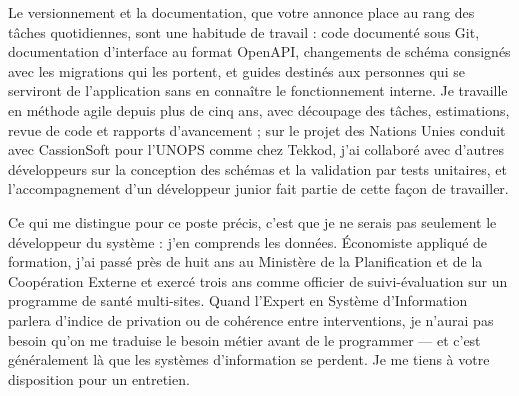 \documentclass[10pt,a4paper,sans]{moderncv}
\begin{document}
Le versionnement et la documentation, que votre annonce place au rang des tâches quotidiennes, sont une habitude de travail : code documenté sous Git, documentation d'interface au format OpenAPI, changements de schéma consignés avec les migrations qui les portent, et guides destinés aux personnes qui se serviront de l'application sans en connaître le fonctionnement interne. Je travaille en méthode agile depuis plus de cinq ans, avec découpage des tâches, estimations, revue de code et rapports d'avancement ; sur le projet des Nations Unies conduit avec CassionSoft pour l'UNOPS comme chez Tekkod, j'ai collaboré avec d'autres développeurs sur la conception des schémas et la validation par tests unitaires, et l'accompagnement d'un développeur junior fait partie de cette façon de travailler.

Ce qui me distingue pour ce poste précis, c'est que je ne serais pas seulement le développeur du système : j'en comprends les données. Économiste appliqué de formation, j'ai passé près de huit ans au Ministère de la Planification et de la Coopération Externe et exercé trois ans comme officier de suivi-évaluation sur un programme de santé multi-sites. Quand l'Expert en Système d'Information parlera d'indice de privation ou de cohérence entre interventions, je n'aurai pas besoin qu'on me traduise le besoin métier avant de le programmer --- et c'est généralement là que les systèmes d'information se perdent. Je me tiens à votre disposition pour un entretien.

\makeletterclosing
\end{document}
